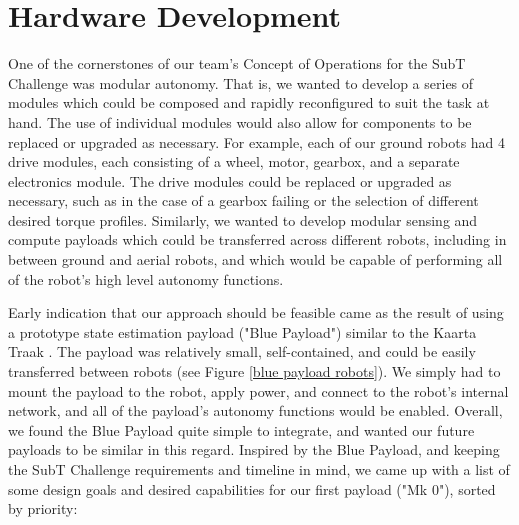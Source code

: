 \chapter{Hardware Development}

One of the cornerstones of our team's Concept of Operations for the SubT Challenge was modular autonomy. That is, we wanted to develop a series of modules which could be composed and rapidly reconfigured to suit the task at hand. The use of individual modules would also allow for components to be replaced or upgraded as necessary. For example, each of our ground robots had 4 drive modules, each consisting of a wheel, motor, gearbox, and a separate electronics module. The drive modules could be replaced or upgraded as necessary, such as in the case of a gearbox failing or the selection of different desired torque profiles. Similarly, we wanted to develop modular sensing and compute payloads which could be transferred across different robots, including in between ground and aerial robots, and which would be capable of performing all of the robot's high level autonomy functions.

Early indication that our approach should be feasible came as the result of using a prototype state estimation payload ("Blue Payload") similar to the Kaarta Traak \cite{kaarta_traak}. The payload was relatively small, self-contained, and could be easily transferred between robots (see Figure \ref{blue payload robots}). We simply had to mount the payload to the robot, apply power, and connect to the robot's internal network, and all of the payload's autonomy functions would be enabled. Overall, we found the Blue Payload quite simple to integrate, and wanted our future payloads to be similar in this regard. Inspired by the Blue Payload, and keeping the SubT Challenge requirements and timeline in mind, we came up with a list of some design goals and desired capabilities for our first payload ("Mk 0"), sorted by priority:

